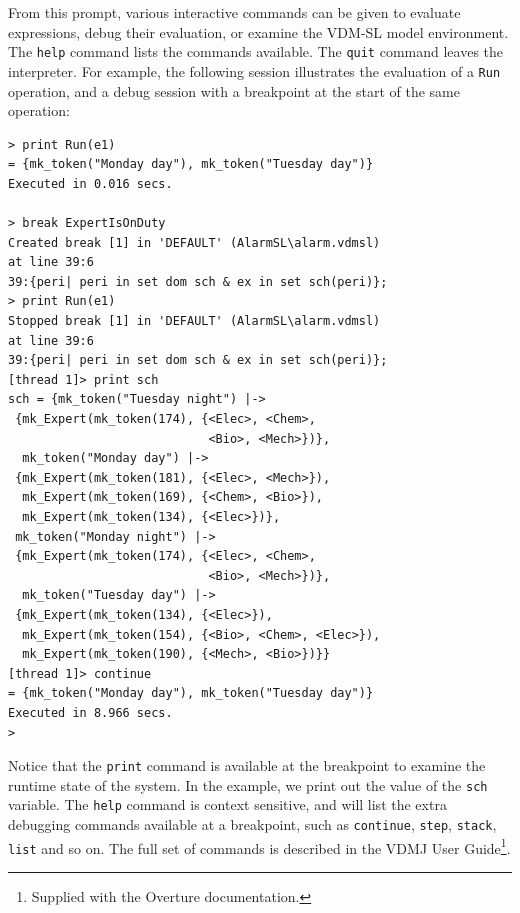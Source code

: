 \noindent From this prompt, various interactive commands can be given
to evaluate expressions, debug their evaluation, or examine the
VDM-SL model environment.  The \verb|help| command lists the commands
available. The \verb|quit| command leaves the interpreter.
For example, the following session illustrates the evaluation of a
\verb|Run| operation, and a debug session with a breakpoint at the
start of the same operation:

\begin{lstlisting}
> print Run(e1)
= {mk_token("Monday day"), mk_token("Tuesday day")}
Executed in 0.016 secs.

> break ExpertIsOnDuty
Created break [1] in 'DEFAULT' (AlarmSL\alarm.vdmsl) 
at line 39:6
39:{peri| peri in set dom sch & ex in set sch(peri)};
> print Run(e1)
Stopped break [1] in 'DEFAULT' (AlarmSL\alarm.vdmsl) 
at line 39:6
39:{peri| peri in set dom sch & ex in set sch(peri)};
[thread 1]> print sch
sch = {mk_token("Tuesday night") |->
 {mk_Expert(mk_token(174), {<Elec>, <Chem>, 
                            <Bio>, <Mech>})},
  mk_token("Monday day") |->
 {mk_Expert(mk_token(181), {<Elec>, <Mech>}),
  mk_Expert(mk_token(169), {<Chem>, <Bio>}),
  mk_Expert(mk_token(134), {<Elec>})},
 mk_token("Monday night") |->
 {mk_Expert(mk_token(174), {<Elec>, <Chem>, 
                            <Bio>, <Mech>})},
  mk_token("Tuesday day") |->
 {mk_Expert(mk_token(134), {<Elec>}),
  mk_Expert(mk_token(154), {<Bio>, <Chem>, <Elec>}),
  mk_Expert(mk_token(190), {<Mech>, <Bio>})}}
[thread 1]> continue
= {mk_token("Monday day"), mk_token("Tuesday day")}
Executed in 8.966 secs. 
> 
\end{lstlisting}

\noindent Notice that the \verb|print| command is available at the
breakpoint to examine the runtime state of the system. In the example,
we print out the value of the \verb|sch| variable. The \verb|help|
command is context sensitive, and will list the extra debugging
commands available at a breakpoint, such as \verb|continue|,
\verb|step|, \verb|stack|, \verb|list| and so on. The full set of
commands is described in the VDMJ User Guide\footnote{Supplied with
the Overture documentation.}.

%
\lstset{style=mystyle}

